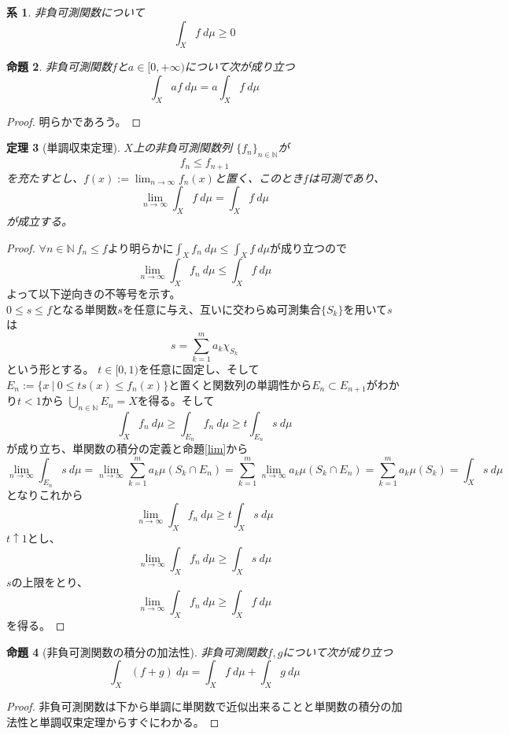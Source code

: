 \documentclass[leqno]{jsarticle}
\newtheorem{thm}{定理}
\newtheorem{prop}[thm]{命題}
\newtheorem{cor}[thm]{系}
\newcommand{\nn}{\mathbb{N}}
\newcommand{\mgn}{\infty}
\newcommand{\ffnn}{\{f_{n}\}_{n\in \nn}}
\begin{document}
\begin{cor}非負可測関数について
\[
\int_X f\ d\mu\ge 0
\]
\end{cor}


\begin{prop}非負可測関数$f$と$a\in [0,+\mgn)$について次が成り立つ
\[
\int_X af\ d\mu =a\int_Xf\ d\mu
\]
\end{prop}
\begin{proof}
明らかであろう。
\end{proof}



\begin{thm}[単調収束定理]$X$上の非負可測関数列
$\ffnn$が
 \[
  f_{n}\le f_{n+1}
 \]を充たすとし、$\displaystyle f(x):=\lim_{n\to \infty}f_{n}(x)$と置く、このとき$f$は可測であり、
 \[
  \lim_{n\to \infty}\int_X f\ d \mu =\int_X f\ d\mu
 \] が成立する。
\end{thm}
\begin{proof}
$\forall n\in \nn \ f_{n}\le f$より明らかに$\displaystyle \int_X f_{n}\ d\mu \le \int_X f\ d\mu$が成り立つので
 \[
  \lim_{n\to \infty}\int_X f_{n}\ d\mu \le \int_X f\ d\mu
 \]よって以下逆向きの不等号を示す。\\
$0\le s \le f$となる単関数$s$を任意に与え、互いに交わらぬ可測集合$\{S_k\}$を用いて$s$は
 \[
  s=\sum_{k=1}^{m}a_k\chi_{S_k}
 \]
という形とする。
 $t\in [0,1)$を任意に固定し、そして$E_{n}:=\{x\ |\ 0\le ts(x) \le f_{n}(x)\}$と置くと関数列の単調性から$E_{n}\subset E_{n+1}$がわかり$t<1$から
$\bigcup_{n\in \nn }E_{n}=X$を得る。そして
 \[
  \int_{X} f_{n}\ d\mu \ge \int_{E_{n}}f_{n}\ d\mu \ge t\int_{E_{n}} s\ d\mu
 \]が成り立ち、単関数の積分の定義と命題\ref{lim}から
 \[
  \lim_{n\to \infty} \int_{E_{n}} s\ d\mu =\lim_{n\to \infty} \sum_{k=1}^ma_k\mu(S_k\cap E_n)
=\sum_{k=1}^m\lim_{n \to \infty} a_k\mu(S_k\cap E_n)=\sum_{k=1}^ma_k\mu(S_k)=\int_{X}s\ d\mu
 \]となりこれから
 \[
  \lim _{n\to \infty} \int_{X} f_{n}\ d\mu \ge t\int_{X} s\ d\mu
 \]$t\uparrow 1$とし、
 \[
  \lim _{n\to \infty} \int_{X} f_{n}\ d\mu \ge \int_{X} s\ d\mu
 \]
$s$の上限をとり、
 \[
  \lim _{n\to \infty} \int_{X} f_{n}\ d\mu \ge \int_{X} f\ d\mu
 \]を得る。
\end{proof}
\begin{prop}[非負可測関数の積分の加法性]
非負可測関数$f,g$について次が成り立つ
\[
\int_X(f+g)\ d\mu=\int_Xf\ d\mu+\int_Xg\ d\mu
\]
\end{prop}
\begin{proof}
非負可測関数は下から単調に単関数で近似出来ることと単関数の積分の加法性と単調収束定理からすぐにわかる。
\end{proof}
\end{document}

